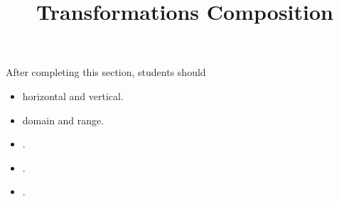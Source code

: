 \documentclass{ximera}
\title{Transformations Composition}
\begin{document}
\begin{abstract}
\end{abstract}
\maketitle

\begin{sectionOutcomes}
After completing this section, students should 

\begin{itemize}
\item horizontal and vertical.
\item domain and range.
\item .
\item .
\item .
\end{itemize}
\end{sectionOutcomes}
\end{document}
